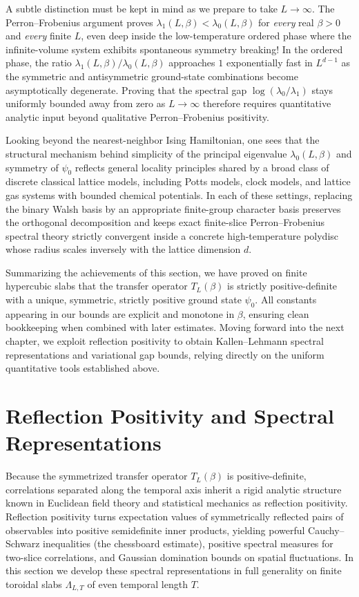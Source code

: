 \documentclass[11pt]{article}
\theoremstyle{definition}
\begin{document}
A subtle distinction must be kept in mind as we prepare to take $L \to \infty$. The
Perron--Frobenius argument proves $\lambda_1(L, \beta) < \lambda_0(L, \beta)$ for
\emph{every} real $\beta > 0$ and \emph{every} finite $L$, even deep inside the
low-temperature ordered phase where the infinite-volume system exhibits spontaneous
symmetry breaking! In the ordered phase, the ratio $\lambda_1(L, \beta) /
\lambda_0(L, \beta)$ approaches $1$ exponentially fast in $L^{d-1}$ as the symmetric
and antisymmetric ground-state combinations become asymptotically degenerate.
Proving that the spectral gap $\log(\lambda_0 / \lambda_1)$ stays uniformly bounded
away from zero as $L \to \infty$ therefore requires quantitative analytic input
beyond qualitative Perron--Frobenius positivity.

Looking beyond the nearest-neighbor Ising Hamiltonian, one sees that the structural
mechanism behind simplicity of the principal eigenvalue $\lambda_0(L, \beta)$ and
symmetry of $\psi_0$ reflects general locality principles shared by a broad class of
discrete classical lattice models, including Potts models, clock models, and lattice
gas systems with bounded chemical potentials. In each of these settings, replacing
the binary Walsh basis by an appropriate finite-group character basis preserves the
orthogonal decomposition and keeps exact finite-slice Perron--Frobenius spectral
theory strictly convergent inside a concrete high-temperature polydisc whose radius
scales inversely with the lattice dimension $d$.

Summarizing the achievements of this section, we have proved on finite hypercubic
slabs that the transfer operator $T_L(\beta)$ is strictly positive-definite with a
unique, symmetric, strictly positive ground state $\psi_0$. All constants appearing
in our bounds are explicit and monotone in $\beta$, ensuring clean bookkeeping when
combined with later estimates. Moving forward into the next chapter, we exploit
reflection positivity to obtain Kallen--Lehmann spectral representations and
variational gap bounds, relying directly on the uniform quantitative tools
established above.

\section{Reflection Positivity and Spectral Representations}
\label{sec:s06}

Because the symmetrized transfer operator $T_L(\beta)$ is positive-definite,
correlations separated along the temporal axis inherit a rigid analytic structure
known in Euclidean field theory and statistical mechanics as reflection positivity.
Reflection positivity turns expectation values of symmetrically reflected pairs of
observables into positive semidefinite inner products, yielding powerful
Cauchy--Schwarz inequalities (the chessboard estimate), positive spectral measures
for two-slice correlations, and Gaussian domination bounds on spatial fluctuations.
In this section we develop these spectral representations in full generality on
finite toroidal slabs $\Lambda_{L,T}$ of even temporal length $T$.
\end{document}
